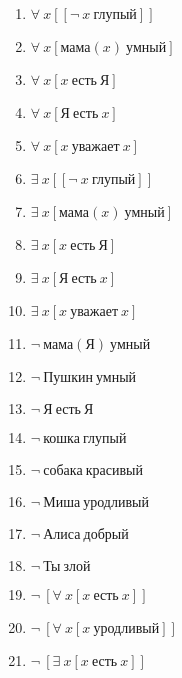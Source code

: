 \documentclass{article}
\begin{document}
\begin{enumerate}
\item $\forall \ x[[\neg \ x \ \text{глупый}]]$

\item $\forall \ x[\text{мама}(x) \ \text{умный}]$

\item $\forall \ x[x \ \text{есть} \ \text{Я}]$

\item $\forall \ x[\text{Я} \ \text{есть} \ x]$

\item $\forall \ x[x \ \text{уважает} \ x]$

\item $\exists \ x[[\neg \ x \ \text{глупый}]]$

\item $\exists \ x[\text{мама}(x) \ \text{умный}]$

\item $\exists \ x[x \ \text{есть} \ \text{Я}]$

\item $\exists \ x[\text{Я} \ \text{есть} \ x]$

\item $\exists \ x[x \ \text{уважает} \ x]$

\item $\neg \ \text{мама}(\text{Я}) \ \text{умный}$

\item $\neg \ \text{Пушкин} \ \text{умный}$

\item $\neg \ \text{Я} \ \text{есть} \ \text{Я}$

\item $\neg \ \text{кошка} \ \text{глупый}$

\item $\neg \ \text{собака} \ \text{красивый}$

\item $\neg \ \text{Миша} \ \text{уродливый}$

\item $\neg \ \text{Алиса} \ \text{добрый}$

\item $\neg \ \text{Ты} \ \text{злой}$

\item $\neg \ [\forall \ x[x \ \text{есть} \ x]]$

\item $\neg \ [\forall \ x[x \ \text{уродливый}]]$

\item $\neg \ [\exists \ x[x \ \text{есть} \ x]]$


\end{enumerate}
\end{document}
